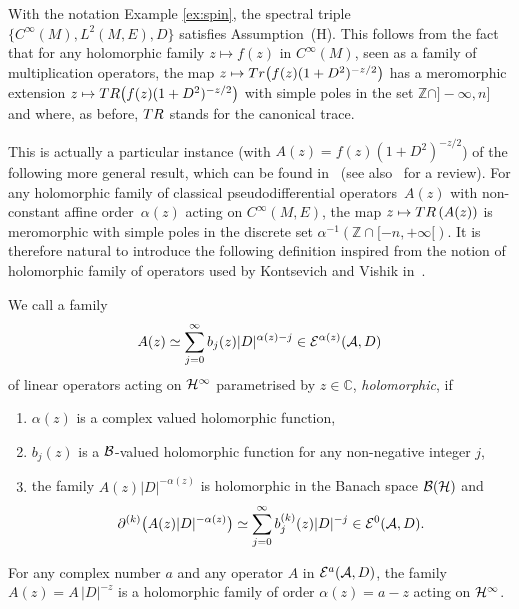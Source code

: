 \documentclass[11pt]{article}
\def \C{\mathbb C}
\def \Z {\mathbb Z}
\def \Ci {{C^\infty}}
\numberwithin{equation}{section}
\begin{document}
\begin{example}
  With the notation Example \ref{ex:spin}, the spectral triple $\{\Ci(M), L^2(M, E), D\}$ sa\-tisf\/ies Assumption~(H). This follows from
  the fact that for any
  holomorphic family $z\mapsto f(z)$ in $\Ci(M)$, seen as a family of
  multiplication operators, the map $z\mapsto {\rm Tr}\big(f(z)   (1+
    D^2 )^{-z/2}\big)$ has a meromorphic extension  $z\mapsto {\rm TR}\big(f(z)   (1+
    D^2 )^{-z/2}\big)$ with simple poles in the set $ \Z\cap
]{-}\infty,n]$ and where, as before, ${\rm  TR}$ stands for the canonical
trace.
\end{example} This is actually a particular instance (with  $A(z)= f(z)   ( 1+
    D^2 )^{-z/2}$) of the following  more general result,
which can be found in~\cite{KV} (see also~\cite{Pa1} for a review). For any holomorphic family of classical pseudodif\/ferential
operators~$A(z)$ with non-constant af\/f\/ine order~$\alpha(z)$ acting on
$\Ci(M,E)$, the map  $z\mapsto {\rm TR}\left(A(z)\right)$ is meromorphic with
simple poles in the discrete set $\alpha^{-1}\left( \Z\cap   [{-}n, +\infty[\right)$. It is therefore natural to introduce
the following def\/inition  inspired from the notion of holomorphic family of
operators used by Kontsevich and Vishik in~\cite{KV}.

\begin{definition} \label{defn:holfamily}   We  call  a family
\begin{gather*}%
A(z)\simeq \sum_{j=0}^\infty b_j(z) \vert D\vert^{\alpha(z)-j}  \in {\cal E}^{\alpha(z)}({\cal A}, D)
\end{gather*}  of
linear  operators acting on ${\cal H}^\infty$  parametrised by $z\in \C$,
 {\it holomorphic}, if
\begin{enumerate}
\itemsep=0pt
\item[1)]    $\alpha(z)$  is a  complex valued  holomorphic function,
\item[2)]    $b_j(z)$  is a ${\cal B}$-valued holomorphic function for any  non-negative integer $j$,
\item[3)] the family $A(z)\vert D\vert^{-\alpha(z)}$ is holomorphic in the Banach space ${\cal B}({\cal H})$ and
\[
\partial^{(k)}\big(A(z)\vert D\vert^{-\alpha(z)}\big)\simeq  \sum_{j=0}^\infty b_j^{(k)}(z) \vert D\vert^{-j}  \in {\cal E}^{0}({\cal A}, D).
\]
\end{enumerate}
\end{definition}

\begin{example}\label{ex:1} For any complex number $a$ and any operator  $A$ in ${\cal E}^a({\cal A},D)$, the family $A(z)= A\, \vert D\vert^{-z}$ is   a holomorphic family of order
  $\alpha(z)=a-z$ acting on ${\cal H}^\infty$.
\end{example}
\end{document}

